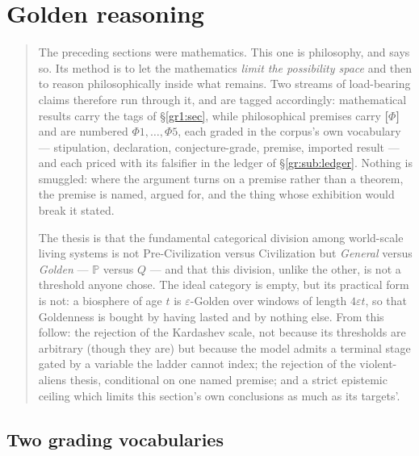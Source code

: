 \documentclass[11pt]{article}
\numberwithin{equation}{section}
\theoremstyle{plain}
\theoremstyle{definition}
\theoremstyle{remark}
\newcommand{\PP}{\mathbb{P}}
\begin{document}
\section{Golden reasoning}\label{gr:sec}

\begin{quote}\small
The preceding sections were mathematics. This one is philosophy, and
says so. Its method is to let the mathematics \emph{limit the
possibility space} and then to reason philosophically inside what
remains. Two streams of load-bearing claims therefore run through it,
and are tagged accordingly: mathematical results carry the tags of
\S\ref{gr1:sec}, while philosophical premises carry \textbf{[$\Phi$]} and
are numbered $\Phi1,\dots,\Phi5$, each graded in the corpus's own
vocabulary --- stipulation, declaration, conjecture-grade, premise,
imported result --- and each priced with its falsifier in the ledger of
\S\ref{gr:sub:ledger}. Nothing is smuggled: where the argument turns on
a premise rather than a theorem, the premise is named, argued for, and
the thing whose exhibition would break it stated.

The thesis is that the fundamental categorical division among
world-scale living systems is not Pre-Civilization versus Civilization
but \emph{General} versus \emph{Golden} --- $\PP$ versus $Q$ --- and
that this division, unlike the other, is not a threshold anyone chose.
The ideal category is empty, but its practical form is not: a biosphere
of age $t$ is $\varepsilon$-Golden over windows of length $4\varepsilon
t$, so that Goldenness is bought by having lasted and by nothing else.
From this follow: the rejection of the Kardashev scale, not because its
thresholds are arbitrary (though they are) but because the model admits
a terminal stage gated by a variable the ladder cannot index; the rejection of the
violent-aliens thesis, conditional on one named premise; and a strict
epistemic ceiling which limits this section's own conclusions as much as
its targets'.
\end{quote}

\subsection*{Two grading vocabularies}
\label{gr:sub:grades}
\end{document}
